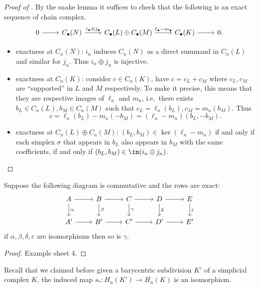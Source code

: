 \documentclass[a4paper]{article}
\begin{document}
\begin{proof}[Proof of ]
  By the snake lemma it suffices to check that the following is an exact sequence of chain complex.
  \[
    \begin{tikzcd}
      0 \ar[r] & C_\bullet(N) \ar[r, "i_\bullet \oplus j_\bullet"] & C_\bullet(L) \oplus C_\bullet(M) \ar[r, "\ell_\bullet - m_\bullet"] & C_\bullet(K) \ar[r] & 0.
    \end{tikzcd}
  \]
  \begin{itemize}
  \item exactness at \(C_n(N)\): \(i_n\) induces \(C_n(N)\) as a direct summand in \(C_n(L)\) and similar for \(j_n\). Thus \(i_n \oplus j_n\) is injective.
  \item exactness at \(C_n(K)\): consider \(c \in C_n(K)\), have \(c = c_L + c_M\) where \(c_L, c_M\) are ``supported'' in \(L\) and \(M\) respectively. To make it precise, this means that they are respective images of \(\ell_n\) and \(m_n\), i.e.\ there exists \(b_L \in C_n(L), b_M \in C_n(M)\) such that \(c_L = \ell_n(b_L), c_M = m_n(b_M)\). Thus
    \[
      c = \ell_n(b_L) - m_n(-b_M) = (\ell_n - m_n)(b_L, -b_M).
    \]
  \item exactness at \(C_n(L) \oplus C_n(M)\): \((b_L, b_M) \in \ker(\ell_n - m_n)\) if and only if each simplex \(\sigma\) that appears in \(b_L\) also appears in \(b_M\) with the same coefficients, if and only if \((b_L, b_M) \in \im(i_n \oplus j_n)\).
  \end{itemize}
\end{proof}

\begin{lemma}
  Suppose the following diagram is commutative and the rows are exact:
  \[
    \begin{tikzcd}
      A \ar[r] \ar[d, "\alpha"] & B \ar[r] \ar[d, "\beta"] & C \ar[r] \ar[d, "\gamma"] & D \ar[r] \ar[d, "\delta"] & E \ar[d, "\varepsilon"] \\
      A' \ar[r] & B' \ar[r] & C' \ar[r] & D' \ar[r] & E'
    \end{tikzcd}
  \]
  if \(\alpha, \beta, \delta, \varepsilon\) are isomorphisms then so is \(\gamma\).
\end{lemma}

\begin{proof}
  Example sheet 4.
\end{proof}

Recall that we claimed before given a barycentric subdivision \(K'\) of a simplicial complex \(K\), the induced map \(s_*: H_n(K') \to H_n(K)\) is an isomorphism.
\end{document}
